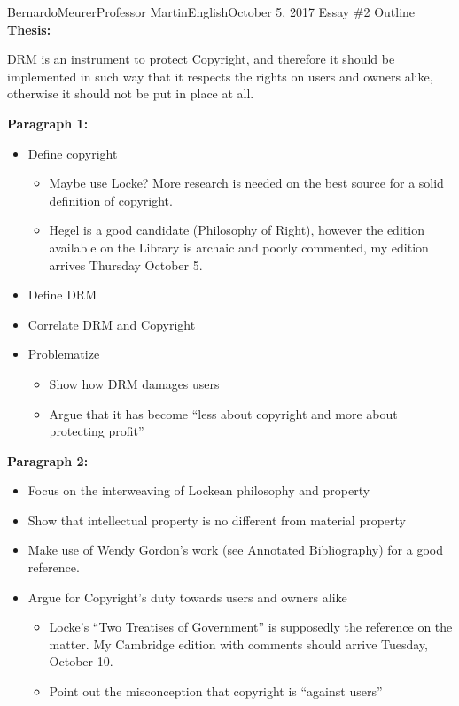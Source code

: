 \documentclass[12pt,letterpaper]{article}
\begin{document}
        \begin{mla}{Bernardo}{Meurer}{Professor Martin}{English}{October 5, 2017}%
            {Essay \#2 Outline}
        \noindent \textbf{Thesis:}
        
            DRM is an instrument to protect Copyright, and therefore it should be implemented in such way that it respects the rights on users and owners alike, otherwise it should not be put in place at all.
        
        \noindent \textbf{Paragraph 1:}

            \begin{itemize}
                \item Define copyright
                \begin{itemize}
                    \item Maybe use Locke? More research is needed on the best source for a solid definition of copyright.
                    \item Hegel is a good candidate (Philosophy of Right), however the edition available on the Library is archaic and poorly commented, my edition arrives Thursday October 5.
                \end{itemize}
                \item Define DRM
                \item Correlate DRM and Copyright
                \item Problematize
                \begin{itemize}
                    \item Show how DRM damages users
                    \item Argue that it has become ``less about copyright and more about protecting profit''
                \end{itemize}

            \end{itemize}

        \noindent \textbf{Paragraph 2:}

            \begin{itemize}
                \item Focus on the interweaving of Lockean philosophy and property
                \item Show that intellectual property is no different from material property
                \item  Make use of Wendy Gordon's work (see Annotated Bibliography) for a good reference.
                \item Argue for Copyright's duty towards users and owners alike
                \begin{itemize}
                    \item Locke's ``Two Treatises of Government'' is supposedly the reference on the matter. My Cambridge edition with comments should arrive Tuesday, October 10.
                    \item Point out the misconception that copyright is ``against users'' 
                \end{itemize}
            \end{itemize}


\end{mla}
\end{document}
